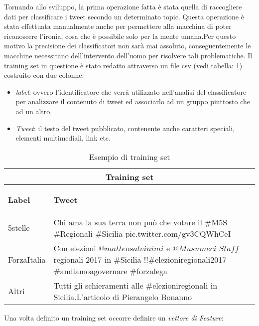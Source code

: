 Tornando allo sviluppo, la prima operazione fatta è stata quella di raccogliere dati per classificare i tweet secondo un determinato topic. Questa operazione è stata effettuata manualmente anche per permettere alla macchina di poter riconoscere l'ironia, cosa che è possibile solo per la mente umana.Per questo motivo la precisione dei classificatori non sarà mai assoluto, conseguentemente le macchine necessitano dell'intervento dell'uomo per risolvere tali problematiche. Il training set in questione è stato redatto attraverso un file csv (vedi tabella: \ref{training}) costruito con due colonne:
\begin{itemize}
\item \textit{label}: ovvero l'identificatore che verrà utilizzato nell'analisi del classificatore per analizzare il contenuto di tweet ed associarlo ad un gruppo piuttosto che ad un altro.
\item \textit{Tweet}: il testo del tweet pubblicato, contenente anche caratteri speciali, elementi multimediali, link etc.
\end{itemize}
\begin{table}[!htb]
\centering

\begin{tabular}{ |p{3cm}|p{7cm}| }
 \hline
 \multicolumn{2}{|c|}{\textbf{Training set}} \\
 \hline 
 \begin{center}
 \textbf{Label}
 \end{center} & \begin{center}
 \textbf{Tweet}
 \end{center}\\
 \hline
 5stelle   & Chi ama la sua terra non può che votare il \#M5S \#Regionali \#Sicilia pic.twitter.com/gv3CQWhCeI   \\
 ForzaItalia &   Con elezioni $ @matteosalvinimi$ e $@Musumeci\_Staff$ regionali 2017 in \#Sicilia !!\#elezioniregionali2017 \#andiamoagovernare \#forzalega  \\
Altri & Tutti gli schieramenti alle \#elezioniregionali in Sicilia.L'articolo di Pierangelo Bonanno \\
 \hline
\end{tabular}

\caption{Esempio di training set}
\label{training}
\end{table}
Una volta definito un training set occorre definire un \textit{vettore di Feature}:
